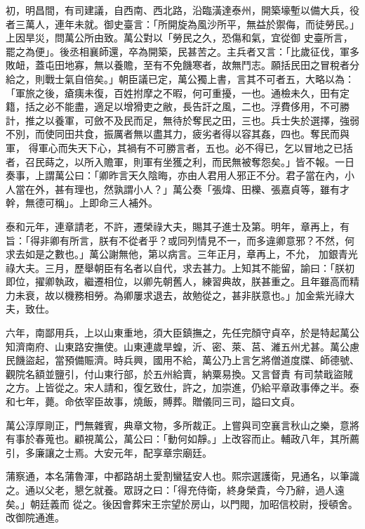 \begin{pinyinscope}
 初，明昌間，有司建議，自西南、西北路，沿臨潢達泰州，開築壕塹以備大兵，役者三萬人，連年未就。御史臺言：「所開旋為風沙所平，無益於禦侮，而徒勞民。」上因旱災，問萬公所由致。萬公對以「勞民之久，恐傷和氣，宜從御
 史臺所言，罷之為便」。後丞相襄師還，卒為開築，民甚苦之。主兵者又言：「比歲征伐，軍多敗衄，蓋屯田地寡，無以養贍，至有不免饑寒者，故無鬥志。願括民田之冒稅者分給之，則戰士氣自倍矣。」朝臣議已定，萬公獨上書，言其不可者五，大略以為：「軍旅之後，瘡痍未復，百姓拊摩之不暇，何可重擾，一也。通檢未久，田有定籍，括之必不能盡，適足以增猾吏之敝，長告訐之風，二也。浮費侈用，不可勝計，推之以養軍，可斂不及民而足，無待於奪民之田，三也。兵士失於選擇，強弱不別，而使同田共食，振厲者無以盡其力，疲劣者得以容其姦，四也。奪民而與軍，
 得軍心而失天下心，其禍有不可勝言者，五也。必不得已，乞以冒地之已括者，召民蒔之，以所入贍軍，則軍有坐獲之利，而民無被奪怨矣。」皆不報。一日奏事，上謂萬公曰：「卿昨言天久陰晦，亦由人君用人邪正不分。君子當在內，小人當在外，甚有理也，然孰謂小人？」萬公奏「張煒、田櫟、張嘉貞等，雖有才幹，無德可稱」。上即命三人補外。



 泰和元年，連章請老，不許，遷榮祿大夫，賜其子進士及第。明年，章再上，有旨：「得非卿有所言，朕有不從者乎？或同列情見不一，而多違卿意邪？不然，何求去如是之數也。」萬公謝無他，第以病言。三年正月，章再上，不允，
 加銀青光祿大夫。三月，歷舉朝臣有名者以自代，求去甚力。上知其不能留，諭曰：「朕初即位，擢卿執政，繼遷相位，以卿先朝舊人，練習典故，朕甚重之。且年雖高而精力未衰，故以機務相勞。為卿屢求退去，故勉從之，甚非朕意也。」加金紫光祿大夫，致仕。



 六年，南鄙用兵，上以山東重地，須大臣鎮撫之，先任完顏守貞卒，於是特起萬公知濟南府、山東路安撫使。山東連歲旱蝗，沂、密、萊、莒、濰五州尤甚。萬公慮民饑盜起，當預備賑濟。時兵興，國用不給，萬公乃上言乞將僧道度牒、師德號、觀院名額並鹽引，付山東行部，於五州給賣，納粟易換。又言督責
 有司禁戢盜賊之方。上皆從之。宋人請和，復乞致仕，許之，加崇進，仍給平章政事俸之半。泰和七年，薨。命依宰臣故事，燒飯，賻葬。贈儀同三司，謚曰文貞。



 萬公淳厚剛正，門無雜賓，典章文物，多所裁正。上嘗與司空襄言秋山之樂，意將有事於春蒐也。顧視萬公，萬公曰：「動何如靜。」上改容而止。輔政八年，其所薦引，多廉讓之士焉。大安元年，配享章宗廟廷。



 蒲察通，本名蒲魯渾，中都路胡土愛割蠻猛安人也。熙宗選護衛，見通名，以筆識之。通以父老，懇乞就養。眾訝之曰：「得充侍衛，終身榮貴，今乃辭，過人遠矣。」朝廷義而
 從之。後因會葬宋王宗望於房山，以門閥，加昭信校尉，授頓舍。改御院通進。




\end{pinyinscope}
